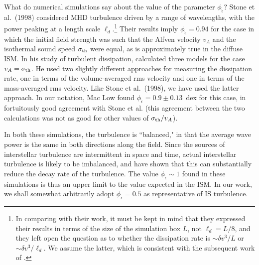 \documentclass[12pt,preprint,flushrt]{aastex}
\newcommand{\sth}{\sigma_{\rm th}}
\newcommand{\phied}{\phi_{{\dot\epsilon}}}
\begin{document}
        What do numerical simulations say about the value
of the parameter $\phied$?
Stone et al.\ (1998) considered MHD turbulence driven by a range of
wavelengths, with the power peaking at a length scale
$\ell_d$.\footnote{In comparing with their work, it must be kept
in mind that they expressed their results in terms of the
size of the simulation box $L$, not $\ell_d=L/8$, and they
left open the question as to whether the dissipation rate
is $\sim\delta v^3/L$ or $\sim\delta v^3/\ell_d$. We assume the
latter, which is consistent with the subsequent work of \cite{mac99}.}
Their results imply
$\phied=0.94$ for the case in which the
initial field strength was such that
the Alfven velocity $v_A$ and the isothermal sound speed
$\sth$ were equal,
as is approximately true in the diffuse ISM.
In his study of turbulent dissipation,
\cite{mac99}  calculated three models for the case $v_A=\sth$.
He used
two slightly different approaches for measuring the dissipation
rate, one in terms of the volume-averaged rms velocity
and one in terms of the mass-averaged rms velocity. Like
Stone et al.\ (1998), we have used the latter approach.
In our notation, Mac Low found $\phied=0.9\pm0.13$~dex for this case, in
fortuitously good agreement with Stone et al.
(this agreement between the two calculations was not as good for other values
of $\sth /v_A$).

          In both these simulations,
the turbulence is ``balanced," in that the average wave power
is the same in both directions along the field.  Since the
sources of interstellar turbulence are intermittent in space
and time, actual interstellar turbulence is likely to
be imbalanced, and \cite{cho02}
have shown that this can substantially
reduce the decay rate of the turbulence.  The value $\phied\sim 1$
found in these simulations is thus an upper limit to the value
expected in the ISM.  In our work, we shall somewhat arbitrarily
adopt $\phied=0.5$ as representative of IS turbulence.
\end{document}
